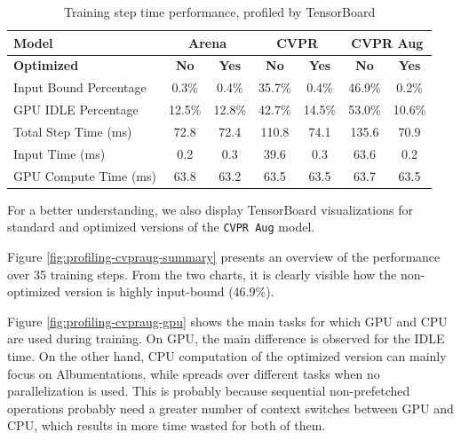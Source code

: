 \begin{table}[H]
	\caption{Training step time performance, profiled by TensorBoard}
	\label{tab:data-generator-profiling}
	\centering
	\begin{tabular}{|l|c|c||c|c||c|c|}
		\hline
		\textbf{Model} & \multicolumn{2}{|c||}{\textbf{Arena}} & \multicolumn{2}{|c||}{\textbf{CVPR}} & \multicolumn{2}{|c|}{\textbf{CVPR Aug}} \\
		\hline
		\textbf{Optimized} & \textbf{No} & \textbf{Yes} & \textbf{No} & \textbf{Yes} & \textbf{No} & \textbf{Yes} \\
		\hline
		Input Bound Percentage      &  0.3\% &  0.4\% & 35.7\% &  0.4\% & 46.9\% &  0.2\% \\
		GPU IDLE Percentage         & 12.5\% & 12.8\% & 42.7\% & 14.5\% & 53.0\% & 10.6\% \\
		\hline
		Total Step Time (ms)        &   72.8 &   72.4 &  110.8 &   74.1 &  135.6 &   70.9 \\
		Input Time (ms)             &    0.2 &    0.3 &   39.6 &    0.3 &   63.6 &    0.2 \\
		GPU Compute Time (ms)       &   63.8 &   63.2 &   63.5 &   63.5 &   63.7 &   63.5 \\
		\hline
		\hline
	\end{tabular}
\end{table}

For a better understanding, we also display TensorBoard visualizations for standard and optimized versions of the \texttt{CVPR Aug} model. 

Figure \ref{fig:profiling-cvpraug-summary} presents an overview of the performance over 35 training steps. From the two charts, it is clearly visible how the non-optimized version is highly input-bound (46.9\%).

Figure \ref{fig:profiling-cvpraug-gpu} shows the main tasks for which GPU and CPU are used during training. On GPU, the main difference is observed for the IDLE time. On the other hand, CPU computation of the optimized version can mainly focus on Albumentations, while spreads over different tasks when no parallelization is used. This is probably because sequential non-prefetched operations probably need a greater number of context switches between GPU and CPU, which results in more time wasted for both of them.

